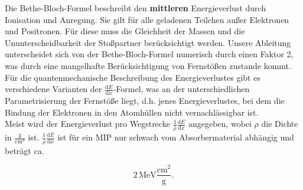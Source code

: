 Die Bethe-Bloch-Formel beschreibt den \textbf{mittleren} Energieverlust durch Ionisation und Anregung. Sie
gilt für alle geladenen Teilchen außer Elektronen und Positronen. Für diese muss die Gleichheit der
Massen und die Ununterscheidbarkeit der Stoßpartner berücksichtigt werden. Unsere Ableitung
unterscheidet sich von der Bethe-Bloch-Formel numerisch durch einen Faktor 2, was durch eine
mangelhafte Berücksichtigung von Fernstößen zustande kommt. Für die quantenmechanische Beschreibung
des Energieverlustes gibt es verschiedene Varianten der $\frac{\mathrm{d}E}{\mathrm{d}x}$-Formel, was an der
unterschiedlichen Parametrisierung der Fernstöße liegt, d.h. jenes Energieverlustes, bei dem die
Bindung der Elektronen in den Atomhüllen nicht vernachlässigbar ist.
\\
Meist wird der Energieverlust pro Wegstrecke $\frac{1}{\rho}\frac{\mathrm{d}E}{\mathrm{d}x}$ angegeben, wobei $\rho$
die Dichte in $\frac{\text{g}}{\text{cm}^3}$ ist. $\frac{1}{\rho}\frac{\mathrm{d}E}{\mathrm{d}x}$ ist für ein MIP nur
schwach vom Absorbermaterial abhängig und beträgt ca. 

\[2\, \text{MeV}\frac{\text{cm}^2}{\text{g}}.\]

\FloatBarrier